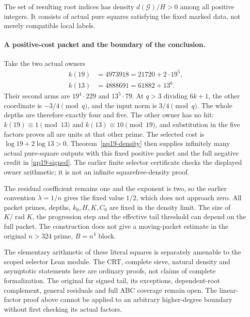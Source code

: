 The set of resulting root indices has density \(d(\mathcal G)/H>0\)
among all positive integers. It consists of actual pure squares
satisfying the fixed marked data, not merely compatible local labels.

\paragraph{A positive-cost packet and the boundary of the conclusion.}
Take the two actual owners
\[
 \begin{split}
 k(19)&=4973918=21720+2\cdot19^5,\\
 k(13)&=4888691=61882+13^6.
 \end{split}
\]
Their second arms are \(19^4\cdot229\) and \(13^5\cdot79\).
At \(q>3\) dividing \(6k+1\), the other coordinate is
\(-3/4\pmod q\), and the input norm is \(3/4\pmod q\).
The whole depths are therefore exactly four and five.
The other owner has no hit: \(k(19)\equiv1\pmod{13}\) and
\(k(13)\equiv10\pmod{19}\), and substitution in the five
factors proves all are units at that other prime. The selected
cost is \(\log19+2\log13>0\). Theorem~\ref{np19-density}
then supplies infinitely many actual pure-square outputs with
this fixed positive packet and the full negative credit in
\eqref{np19-signed}. The earlier finite selector certificate
checks the displayed owner arithmetic; it is not an infinite
squarefree-density proof.

The residual coefficient remains one and the exponent is two,
so the earlier convention \(\lambda=1/n\) gives the fixed value
\(1/2\), which does not approach zero. All packet primes, depths,
\(k_0,H,K,C_0\) are fixed in the density limit. The size of
\(K/\operatorname{rad}K\), the progression step and the effective
tail threshold can depend on the full packet. The construction
does not give a moving-packet estimate in the original
\(n>324\) prime, \(B=n^4\) block.

The elementary arithmetic of these literal squares is separately
amenable to the scoped selector Lean module. The CRT, complete
sieve, natural density and asymptotic statements here are ordinary
proofs, not claims of complete formalization. The original far
signed tail, its exceptions, dependent-root complement, general
residuals and full ABC coverage remain open. The linear-factor
proof above cannot be applied to an arbitrary higher-degree
boundary without first checking its actual factors.
